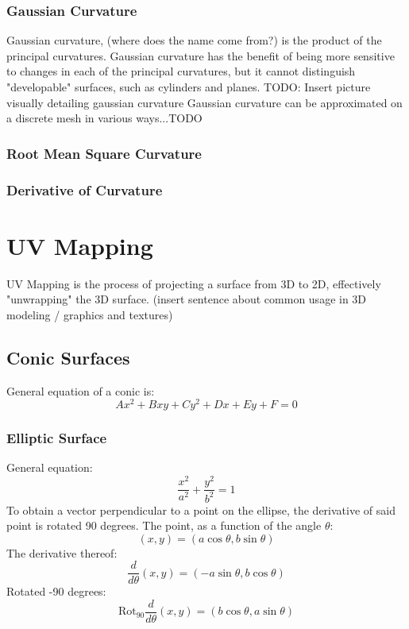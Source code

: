 \subsubsection{Gaussian Curvature}
Gaussian curvature, (where does the name come from?) is the product of the principal curvatures.
Gaussian curvature has the benefit of being more sensitive to changes in each of the principal curvatures, but it cannot distinguish "developable" surfaces, such as cylinders and planes.
TODO: Insert picture visually detailing gaussian curvature
Gaussian curvature can be approximated on a discrete mesh in various ways...TODO

\subsubsection{Root Mean Square Curvature}


\subsubsection{Derivative of Curvature}

\section{UV Mapping}
UV Mapping is the process of projecting a surface from 3D to 2D, effectively "unwrapping" the 3D surface.
(insert sentence about common usage in 3D modeling / graphics and textures)
\subsection{Conic Surfaces}
General equation of a conic is:
\begin{equation}
	Ax^2 + Bxy + Cy^2 + Dx + Ey + F = 0
\end{equation}

\subsubsection{Elliptic Surface}
General equation:
\begin{equation}
	\frac{x^2}{a^2} + \frac{y^2}{b^2} = 1
\end{equation}
To obtain a vector perpendicular to a point on the ellipse, the derivative of said point is rotated 90 degrees.
The point, as a function of the angle $\theta$:
\begin{equation}
	(x,y) = (a\cos\theta, b\sin\theta)
\end{equation}
The derivative thereof:
\begin{equation}
	\frac{d}{d\theta}(x,y) = (-a\sin\theta, b\cos\theta)
\end{equation}
Rotated -90 degrees:
\begin{equation}
	\text{Rot}_{90}\frac{d}{d\theta}(x,y) = (b\cos\theta, a\sin\theta)
\end{equation}

